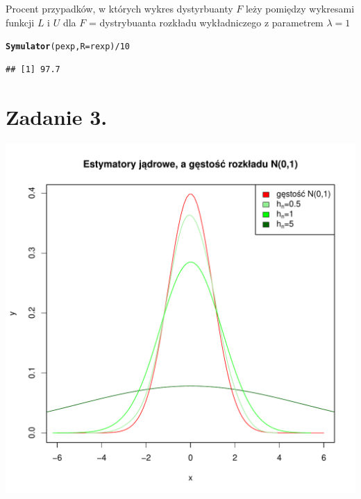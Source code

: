\documentclass[12pt, a4paper]{article}\usepackage[]{graphicx}\usepackage[]{xcolor}
\makeatletter
\def\maxwidth{ %
  \ifdim\Gin@nat@width>\linewidth
    \linewidth
  \else
    \Gin@nat@width
  \fi
}
\newcommand{\hlnum}[1]{\textcolor[rgb]{0.686,0.059,0.569}{#1}}%
\newcommand{\hlopt}[1]{\textcolor[rgb]{0,0,0}{#1}}%
\newcommand{\hlstd}[1]{\textcolor[rgb]{0.345,0.345,0.345}{#1}}%
\newcommand{\hlkwc}[1]{\textcolor[rgb]{0.333,0.667,0.333}{#1}}%
\newcommand{\hlkwd}[1]{\textcolor[rgb]{0.737,0.353,0.396}{\textbf{#1}}}%
\newenvironment{kframe}{%
 \def\at@end@of@kframe{}%
 \ifinner\ifhmode%
  \def\at@end@of@kframe{\end{minipage}}%
  \begin{minipage}{\columnwidth}%
 \fi\fi%
 \def\FrameCommand##1{\hskip\@totalleftmargin \hskip-\fboxsep
 \colorbox{shadecolor}{##1}\hskip-\fboxsep
     \hskip-\linewidth \hskip-\@totalleftmargin \hskip\columnwidth}%
 \MakeFramed {\advance\hsize-\width
   \@totalleftmargin\z@ \linewidth\hsize
   \@setminipage}}%
 {\par\unskip\endMakeFramed%
 \at@end@of@kframe}
\newenvironment{knitrout}{}{} %
\makeatother
\begin{document}
Procent przypadków, w których wykres dystyrbuanty $F$ leży pomiędzy wykresami funkcji $L$ i $U$ dla $F$ = dystrybuanta rozkładu wykładniczego z parametrem $\lambda = 1$
\begin{knitrout}
\color{fgcolor}\begin{kframe}
\begin{alltt}
\hlkwd{Symulator}\hlstd{(pexp,} \hlkwc{R}\hlstd{=rexp)}\hlopt{/}\hlnum{10}
\end{alltt}
\begin{verbatim}
## [1] 97.7
\end{verbatim}
\end{kframe}
\end{knitrout}
\newpage
\section{Zadanie 3.}
\begin{knitrout}
\color{fgcolor}

{\centering \includegraphics[width=\maxwidth]{figure/unnamed-chunk-5-1} 

}


\end{knitrout}
\end{document}
